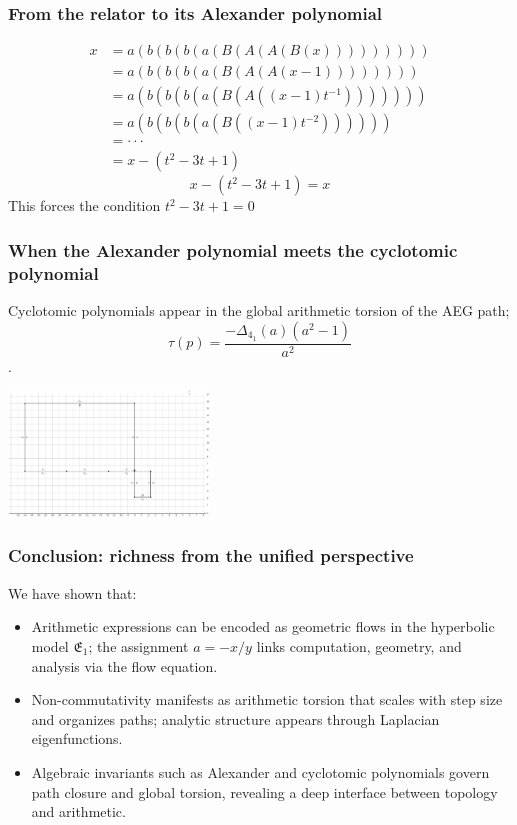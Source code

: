 \documentclass[aspectratio=169]{beamer}
\begin{document}
\begin{frame}
    \frametitle{From the relator to its Alexander polynomial}
\begin{align*}
    x &= a(b(b(b(a(B(A(A(B(x))))))))) \\
    &= a(b(b(b(a(B(A(A(x - 1)))))))) \\
    &= a(b(b(b(a(B(A((x - 1)t^{-1}))))))) \\
    &= a(b(b(b(a(B((x - 1)t^{-2})))))) \\
    &= \cdot\cdot\cdot  \\
    &= x - (t^2 - 3t + 1)
\end{align*}
\[
x - (t^2 - 3t + 1) = x
\]
This forces the condition $t^2 - 3t + 1 = 0$
\end{frame}

\begin{frame}
    \frametitle{When the Alexander polynomial meets the cyclotomic polynomial}
    Cyclotomic polynomials appear in the global arithmetic torsion of the AEG path; $$\tau(p) = \frac{-\Delta_{4_1}(a)(a^2-1)}{a^2}$$.
    \begin{center}
        \includegraphics[width=0.4\textwidth]{../images/alexander_4_1}
    \end{center}
\end{frame}

\begin{frame}
    \frametitle{Conclusion: richness from the unified perspective}
    We have shown that:
    \begin{itemize}
        \item Arithmetic expressions can be encoded as geometric flows in the hyperbolic model $\mathfrak{E}_1$; the assignment $a=-x/y$ links computation, geometry, and analysis via the flow equation.
        \item Non-commutativity manifests as arithmetic torsion that scales with step size and organizes paths; analytic structure appears through Laplacian eigenfunctions.
        \item Algebraic invariants such as Alexander and cyclotomic polynomials govern path closure and global torsion, revealing a deep interface between topology and arithmetic.
    \end{itemize}
\end{frame}
\end{document}
